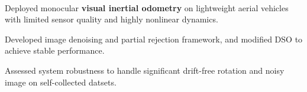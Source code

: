 
	\\

	\begin{itemize*}
		\item Deployed monocular \textbf{visual inertial odometry} on lightweight aerial vehicles with limited sensor quality and highly nonlinear dynamics.
		\item Developed image denoising and partial rejection framework, and modified DSO to achieve stable performance.
		\item Assessed system robustness to handle significant drift-free rotation and noisy image on self-collected datsets. 
	\end{itemize*}